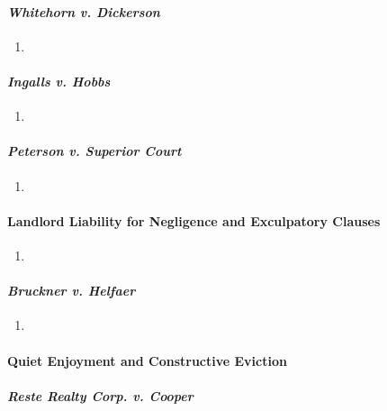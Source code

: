 \paragraph{\emph{Whitehorn v. Dickerson}} %

\begin{enumerate}
    \item 
\end{enumerate}

\paragraph{\emph{Ingalls v. Hobbs}} %

\begin{enumerate}
    \item
\end{enumerate}

\paragraph{\emph{Peterson v. Superior Court}} %

\begin{enumerate}
    \item
\end{enumerate}

\paragraph{Landlord Liability for Negligence and Exculpatory Clauses}

\begin{enumerate}
    \item
\end{enumerate}

\paragraph{\emph{Bruckner v. Helfaer}} %

\begin{enumerate}
    \item
\end{enumerate}

\paragraph{Quiet Enjoyment and Constructive Eviction}

\paragraph{\emph{Reste Realty Corp. v. Cooper}} %

